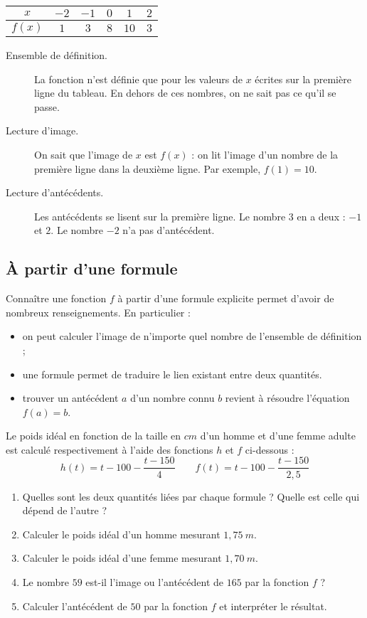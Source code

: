 \documentclass[10pt,openright,twoside,french]{book}
\begin{document}
\begin{center}
\begin{tabular}{|*{6}{c|}}
\hline
$x$ & $-2$ & $-1$ & $0$ & $1$ & $2$ \\
\hline
$f(x)$ & $1$ & $3$ & $8$ & $10$ & $3$ \\
\hline
\end{tabular}
\end{center}\bigskip

\begin{description}
    \item[Ensemble de définition.] La fonction n'est définie que pour les valeurs de $x$ écrites sur la première ligne du tableau. En dehors de ces nombres, on ne sait pas ce qu'il se passe.
    \item[Lecture d'image.] On sait que l'image de $x$ est $f(x)$ : on lit l'image d'un nombre de la première ligne dans la deuxième ligne. Par exemple, $f(1) = 10$.
    \item[Lecture d'antécédents.] Les antécédents se lisent sur la première ligne. Le nombre $3$ en a deux : $-1 $ et $2$. Le nombre $-2$ n'a pas d'antécédent.
\end{description}\bigskip

\subsection{À partir d'une formule}
\begin{Rmq}
    Connaître une fonction $f$ à partir d'une formule explicite permet d'avoir de nombreux renseignements. En particulier :
    \begin{itemize}
        \item on peut calculer l'image de n'importe quel nombre de l'ensemble de définition ;
        \item une formule permet de traduire le lien existant entre deux quantités.
        \item trouver un antécédent $a$ d'un nombre connu $b$ revient à résoudre l'équation $f(a) = b$.
    \end{itemize}
\end{Rmq}\clearpage

\begin{Exemple}
    Le poids idéal en fonction de la taille en $cm$ d'un homme et d'une femme adulte est calculé respectivement à l'aide des fonctions $h$ et $f$ ci-dessous :
    \[h(t) = t - 100 - \dfrac{t - 150}{4} \qquad f(t) =  t - 100 - \dfrac{t - 150}{2,5}\]
    \begin{enumerate}
        \item Quelles sont les deux quantités liées par chaque formule ? Quelle est celle qui dépend de l'autre ?
        \item Calculer le poids idéal d'un homme mesurant $1,75~m$.
        \item Calculer le poids idéal d'une femme mesurant $1,70~m$.
        \item Le nombre $59$ est-il l'image ou l'antécédent de $165$ par la fonction $f$ ?
        \item Calculer l'antécédent de $50$ par la fonction $f$ et interpréter le résultat.
    \end{enumerate}
\end{Exemple}
\end{document}

